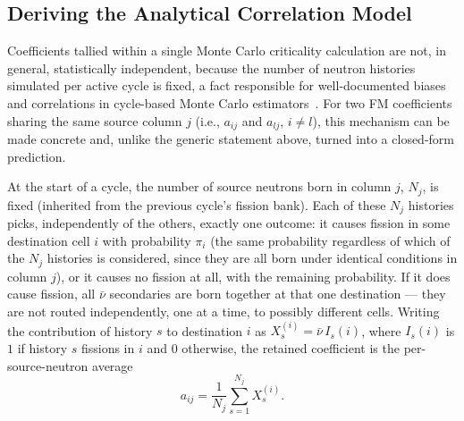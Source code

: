 \documentclass{style/nseJournal}
\begin{document}

\subsection{Deriving the Analytical Correlation Model}
\label{sec:analytical_derivation}

Coefficients tallied within a single Monte Carlo criticality calculation are not, in general, statistically independent, because the number of neutron histories simulated per active cycle is fixed, a fact responsible for well-documented biases and correlations in cycle-based Monte Carlo estimators~\cite{BrissendenGarlick1986}. For two FM coefficients sharing the same source column $j$ (i.e., $a_{ij}$ and $a_{lj}$, $i\neq l$), this mechanism can be made concrete and, unlike the generic statement above, turned into a closed-form prediction.

At the start of a cycle, the number of source neutrons born in column $j$, $N_j$, is fixed (inherited from the previous cycle's fission bank). Each of these $N_j$ histories picks, independently of the others, exactly one outcome: it causes fission in some destination cell $i$ with probability $\pi_i$ (the same probability regardless of which of the $N_j$ histories is considered, since they are all born under identical conditions in column $j$), or it causes no fission at all, with the remaining probability. If it does cause fission, all $\bar\nu$ secondaries are born together at that one destination --- they are not routed independently, one at a time, to possibly different cells. Writing the contribution of history $s$ to destination $i$ as $X_s^{(i)} = \bar\nu\,I_s(i)$, where $I_s(i)$ is $1$ if history $s$ fissions in $i$ and $0$ otherwise, the retained coefficient is the per-source-neutron average
\begin{equation}
  a_{ij} = \frac{1}{N_j}\sum_{s=1}^{N_j} X_s^{(i)} .
  \label{eqn:aij_def}
\end{equation}
\end{document}
